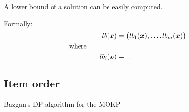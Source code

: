 A lower bound of a solution can be easily computed...

Formally:
\begin{displaymath}
\end{displaymath}
\begin{align*}
    lb(\boldsymbol{x}) &= \big(lb_1(\boldsymbol{x}),\ldots, lb_m(\boldsymbol{x}) \big) \\
    \text{where} \phantom{mmmmm} \\
    lb_i(\boldsymbol{x}) &= ...
\end{align*}

\subsection{Item order}

\begin{algorithm}
  \caption{Bazgan's DP algorithm for the MOKP}
  \label{alg:bazgan}
  
\end{algorithm}




